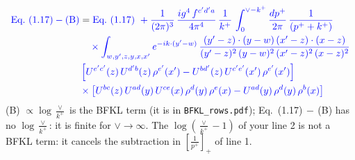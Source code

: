 \documentclass[9pt]{article}
\numberwithin{equation}{section}
\begin{document}
\begin{align*}
{\color{blue}\text{Eq.~(1.17)} - \text{(B)}} &= \color{blue}\text{Eq.~(1.17)}\ +\frac{1}{(2\pi)^{3}}\, \frac{ig^{4}\,f^{c'd'a}}{4\pi^{4}}\, \frac{1}{k^{+}}\,\int_{0}^{\vee-k^{+}}\frac{dp^{+}}{2\pi}\,\frac{1}{(p^{+}+k^{+})}\\ & \color{blue} \quad\times\int_{w,y',z,y,x,x'} e^{-ik\cdot (y'-w)}\,\frac{(y'-z)\cdot (y-w)\,(x'-z)\cdot (x-z)}{(y'-z)^{2}\,(y-w)^{2}\,(x'-z)^{2}\,(x-z)^{2}}\notag \\
& \color{blue}  \left[U^{e'c'}(z)\,U^{d'b}(z)\,\rho^{e'}(x')-U^{bd'}(z)\,U^{c'e'}(x')\,\rho^{e'}(x')\right]\notag \\
& \color{blue}  \times\left[U^{bc}(z)\,U^{ad}(y)\,U^{ce}(x)\,\rho^{d}(y)\,\rho^{e}(x)-U^{ad}(y)\,\rho^{d}(y)\,\rho^{b}(x)\right]
\end{align*}
{\color{blue}\noindent (B) $\propto\log\frac{\vee}{k^+}$ is the BFKL term (it is in \texttt{BFKL\_rows.pdf}); Eq.~(1.17)$\,-\,$(B) has no $\log\frac{\vee}{k^+}$: it is finite for $\vee\to\infty$. The $\log(\frac{\vee}{k^+}-1)$ of your line 2 is not a BFKL term: it cancels the subtraction in $\left[\frac{1}{p^+}\right]_+$ of line 1.}
\end{document}
